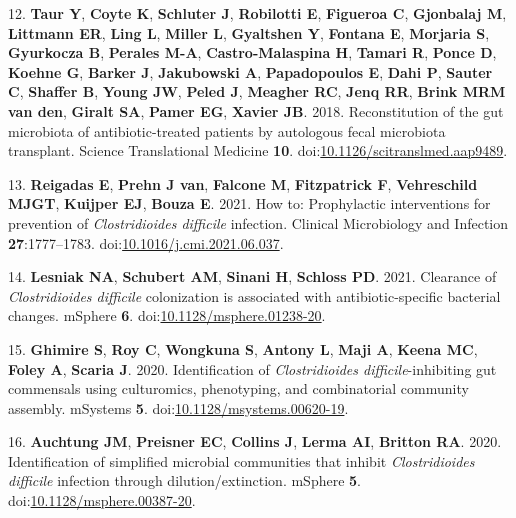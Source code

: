 \documentclass[
  12pt,
]{article}
\newenvironment{cslreferences}%
  {}%
  {\par}
\begin{document}
\begin{cslreferences}
\leavevmode\hypertarget{ref-Taur2018}{}%
12. \textbf{Taur Y}, \textbf{Coyte K}, \textbf{Schluter J},
\textbf{Robilotti E}, \textbf{Figueroa C}, \textbf{Gjonbalaj M},
\textbf{Littmann ER}, \textbf{Ling L}, \textbf{Miller L},
\textbf{Gyaltshen Y}, \textbf{Fontana E}, \textbf{Morjaria S},
\textbf{Gyurkocza B}, \textbf{Perales M-A}, \textbf{Castro-Malaspina H},
\textbf{Tamari R}, \textbf{Ponce D}, \textbf{Koehne G}, \textbf{Barker
J}, \textbf{Jakubowski A}, \textbf{Papadopoulos E}, \textbf{Dahi P},
\textbf{Sauter C}, \textbf{Shaffer B}, \textbf{Young JW}, \textbf{Peled
J}, \textbf{Meagher RC}, \textbf{Jenq RR}, \textbf{Brink MRM van den},
\textbf{Giralt SA}, \textbf{Pamer EG}, \textbf{Xavier JB}. 2018.
Reconstitution of the gut microbiota of antibiotic-treated patients by
autologous fecal microbiota transplant. Science Translational Medicine
\textbf{10}.
doi:\href{https://doi.org/10.1126/scitranslmed.aap9489}{10.1126/scitranslmed.aap9489}.

\leavevmode\hypertarget{ref-Reigadas2021}{}%
13. \textbf{Reigadas E}, \textbf{Prehn J van}, \textbf{Falcone M},
\textbf{Fitzpatrick F}, \textbf{Vehreschild MJGT}, \textbf{Kuijper EJ},
\textbf{Bouza E}. 2021. How to: Prophylactic interventions for
prevention of \emph{Clostridioides difficile} infection. Clinical
Microbiology and Infection \textbf{27}:1777--1783.
doi:\href{https://doi.org/10.1016/j.cmi.2021.06.037}{10.1016/j.cmi.2021.06.037}.

\leavevmode\hypertarget{ref-Lesniak2021}{}%
14. \textbf{Lesniak NA}, \textbf{Schubert AM}, \textbf{Sinani H},
\textbf{Schloss PD}. 2021. Clearance of \emph{Clostridioides difficile}
colonization is associated with antibiotic-specific bacterial changes.
mSphere \textbf{6}.
doi:\href{https://doi.org/10.1128/msphere.01238-20}{10.1128/msphere.01238-20}.

\leavevmode\hypertarget{ref-Ghimire2019}{}%
15. \textbf{Ghimire S}, \textbf{Roy C}, \textbf{Wongkuna S},
\textbf{Antony L}, \textbf{Maji A}, \textbf{Keena MC}, \textbf{Foley A},
\textbf{Scaria J}. 2020. Identification of \emph{Clostridioides
difficile}-inhibiting gut commensals using culturomics, phenotyping, and
combinatorial community assembly. mSystems \textbf{5}.
doi:\href{https://doi.org/10.1128/msystems.00620-19}{10.1128/msystems.00620-19}.

\leavevmode\hypertarget{ref-Auchtung2020}{}%
16. \textbf{Auchtung JM}, \textbf{Preisner EC}, \textbf{Collins J},
\textbf{Lerma AI}, \textbf{Britton RA}. 2020. Identification of
simplified microbial communities that inhibit \emph{Clostridioides
difficile} infection through dilution/extinction. mSphere \textbf{5}.
doi:\href{https://doi.org/10.1128/msphere.00387-20}{10.1128/msphere.00387-20}.


\end{cslreferences}
\end{document}
